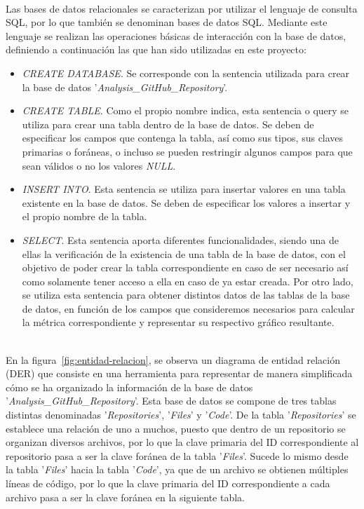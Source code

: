 \documentclass[a4paper, 12pt]{book}
\begin{document}
\\Las bases de datos relacionales se caracterizan por utilizar el lenguaje de consulta SQL, por lo que también se denominan bases de datos SQL. Mediante este lenguaje se realizan las operaciones básicas de interacción con la base de datos, definiendo a continuación las que han sido
utilizadas en este proyecto:
\begin{itemize}
  \item \textit{CREATE DATABASE}. Se corresponde con la sentencia utilizada para crear la base de datos '\textit{Analysis\_GitHub\_Repository}'.
  \item \textit{CREATE TABLE}. Como el propio nombre indica, esta sentencia o query se utiliza para crear una tabla dentro de la base de datos. Se deben de especificar los campos que contenga la tabla, así como sus tipos, sus claves primarias o foráneas, o incluso se pueden restringir
  algunos campos para que sean válidos o no los valores \textit{NULL}.
  \item \textit{INSERT INTO}. Esta sentencia se utiliza para insertar valores en una tabla existente en la base de datos. Se deben de especificar los valores a insertar y el propio nombre de la tabla.
  \item \textit{SELECT}. Esta sentencia aporta diferentes funcionalidades, siendo una de ellas la verificación de la existencia de una tabla de la base de datos, con el objetivo de poder crear la tabla correspondiente en caso de ser necesario así como solamente tener acceso a ella
  en caso de ya estar creada. Por otro lado, se utiliza esta sentencia para obtener distintos datos de las tablas de la base de datos, en función de los campos que consideremos necesarios para calcular la métrica correspondiente y representar su respectivo gráfico resultante.
\end{itemize}

\\En la figura~\ref{fig:entidad-relacion}, se observa un diagrama de entidad relación (DER) que consiste en una herramienta para representar de manera simplificada cómo se ha organizado la información de la base de datos '\textit{Analysis\_GitHub\_Repository}'. Esta base de datos se compone de tres tablas
distintas denominadas '\textit{Repositories}', '\textit{Files}' y '\textit{Code}'. De la tabla '\textit{Repositories}' se establece una relación de uno a muchos, puesto que dentro de un repositorio se organizan diversos archivos, por lo que la clave primaria del ID correspondiente
al repositorio pasa a ser la clave foránea de la tabla '\textit{Files}'. Sucede lo mismo desde la tabla '\textit{Files}' hacia la tabla '\textit{Code}', ya que de un archivo se obtienen múltiples líneas de código, por lo que la clave primaria del ID correspondiente a cada archivo
pasa a ser la clave foránea en la siguiente tabla.
\end{document}
